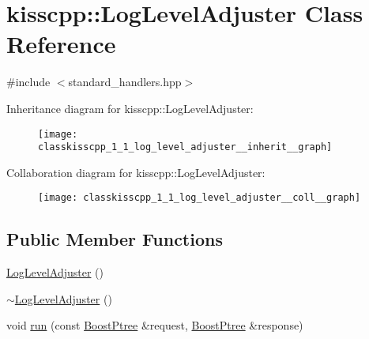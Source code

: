 \hypertarget{classkisscpp_1_1_log_level_adjuster}{\section{kisscpp\-:\-:Log\-Level\-Adjuster Class Reference}
\label{classkisscpp_1_1_log_level_adjuster}
}


{\ttfamily \#include $<$standard\-\_\-handlers.\-hpp$>$}



Inheritance diagram for kisscpp\-:\-:Log\-Level\-Adjuster\-:\nopagebreak
\begin{figure}[H]
\begin{center}
\leavevmode
\texttt{[image: classkisscpp\_1\_1\_log\_level\_adjuster\_\_inherit\_\_graph]}
\end{center}
\end{figure}


Collaboration diagram for kisscpp\-:\-:Log\-Level\-Adjuster\-:\nopagebreak
\begin{figure}[H]
\begin{center}
\leavevmode
\texttt{[image: classkisscpp\_1\_1\_log\_level\_adjuster\_\_coll\_\_graph]}
\end{center}
\end{figure}
\subsection*{Public Member Functions}
\begin{DoxyCompactItemize}
\item 
\hyperlink{classkisscpp_1_1_log_level_adjuster_a59d882a82f2f8ab581278b053066ec99}{Log\-Level\-Adjuster} ()
\item 
\hyperlink{classkisscpp_1_1_log_level_adjuster_a631d7d4e29b6069219e92a7835189bb5}{$\sim$\-Log\-Level\-Adjuster} ()
\item 
void \hyperlink{classkisscpp_1_1_log_level_adjuster_a971d59364d21bbaa283ea520caefa604}{run} (const \hyperlink{boost__ptree_8hpp_ab36820650b8e0db36402aea80485633c}{Boost\-Ptree} \&request, \hyperlink{boost__ptree_8hpp_ab36820650b8e0db36402aea80485633c}{Boost\-Ptree} \&response)
\end{DoxyCompactItemize}


